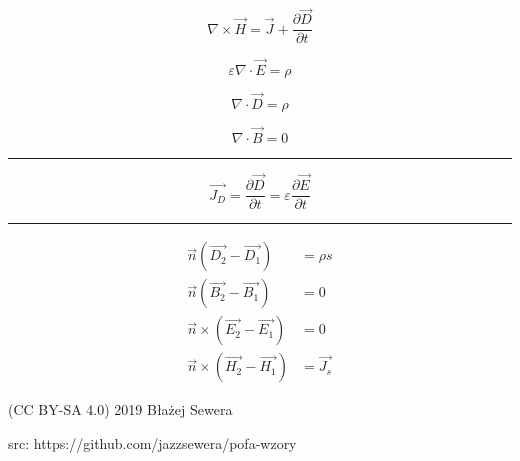 \documentclass[12pt]{article}
\newenvironment{bottompar}{\par\vspace*{\fill}}{\clearpage}
\newcommand{\grayrule}{{\color{lightgray} \hrule}}
\begin{document}
\begin{multicols}{3}
\begin{equation*}
    \nabla \times \Vec{H} = \Vec{J} + \frac{\partial \Vec{D}}{\partial t}
\end{equation*}

\begin{equation*}
    \varepsilon \nabla \cdot \Vec{E} = \rho
\end{equation*}

\begin{equation*}
    \nabla \cdot \Vec{D} = \rho
\end{equation*}

\begin{equation*}
    \nabla \cdot \Vec{B} = 0
\end{equation*}

\grayrule

\begin{equation*}
    \Vec{J_D} = \frac{\partial \Vec{D}}{\partial t}
        = \varepsilon \frac{\partial \Vec{E}}{\partial t}
\end{equation*}

\grayrule

\begin{equation*}
    \begin{split}
        \Vec{n} (\Vec{D_2} - \Vec{D_1}) &= \rho s \\
        \Vec{n} (\Vec{B_2} - \Vec{B_1}) &= 0 \\
        \Vec{n} \times (\Vec{E_2} - \Vec{E_1}) &= 0 \\
        \Vec{n} \times (\Vec{H_2} - \Vec{H_1}) &= \Vec{J_s}
    \end{split}
\end{equation*}

\end{multicols}

\begin{bottompar}
    {\footnotesize \ttfamily (CC BY-SA 4.0) 2019 Błażej Sewera \par
    src: https://github.com/jazzsewera/pofa-wzory}
\end{bottompar}

\end{document}
